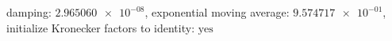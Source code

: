damping: $\num[scientific-notation=true]{2.965060e-08}$, exponential moving average: $\num[scientific-notation=true]{9.574717e-01}$, initialize Kronecker factors to identity: $\text{yes}$